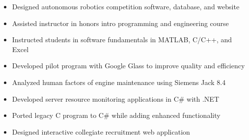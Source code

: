 \documentclass[11pt,letterpaper,ragged2e,withhyper]{altacv}
\begin{document}
\begin{paracol}{2}

\divider

\begin{itemize}
    \item Designed autonomous robotics competition software, database, and website
    \item Assisted instructor in honors intro programming and engineering course
    \item Instructed students in software fundamentals in MATLAB, C/C++, and Excel
\end{itemize}


\divider

\begin{itemize}
    \item Developed pilot program with Google Glass to improve quality and efficiency
    \item Analyzed human factors of engine maintenance using Siemens Jack 8.4
\end{itemize}

\divider

\begin{itemize}
    \item Developed server resource monitoring applications in C\# with .NET
    \item Ported legacy C program to C\# while adding enhanced functionality
    \item Designed interactive collegiate recruitment web application
\end{itemize}


\end{paracol}
\end{document}
